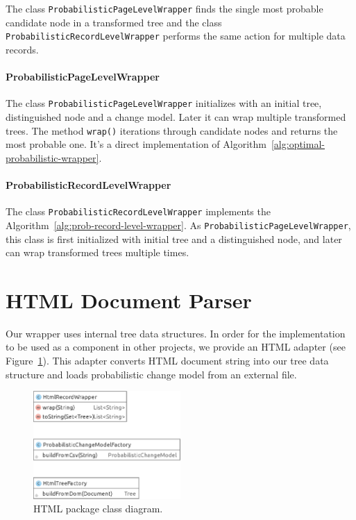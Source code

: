 The class \texttt{ProbabilisticPageLevelWrapper} finds the single most probable candidate node in a transformed tree and the class \texttt{ProbabilisticRecordLevelWrapper} performs the same action for multiple data records.


\paragraph{ProbabilisticPageLevelWrapper} The class \texttt{ProbabilisticPageLevelWrapper} initializes with an initial tree, distinguished node and a change model. Later it can wrap multiple transformed trees. The method \texttt{wrap()} iterations through candidate nodes and returns the most probable one. It's a direct implementation of Algorithm~\ref{alg:optimal-probabilistic-wrapper}.

\paragraph{ProbabilisticRecordLevelWrapper} The class \texttt{ProbabilisticRecordLevelWrapper} implements the Algorithm~\ref{alg:prob-record-level-wrapper}. As \texttt{ProbabilisticPageLevelWrapper}, this class is first initialized with initial tree and a distinguished node, and later can wrap transformed trees multiple times. 


\section{HTML Document Parser}

Our wrapper uses internal tree data structures. In order for the implementation to be used as a component in other projects, we provide an HTML adapter (see Figure~\ref{fig:package-html}). This adapter converts HTML document string into our tree data structure and loads probabilistic change model from an external file.

\begin{figure}[h]
	\centering
	\includegraphics[width=0.5\textwidth]{figures/package-html}
	\caption{HTML package class diagram.}
	\label{fig:package-html}
\end{figure}

